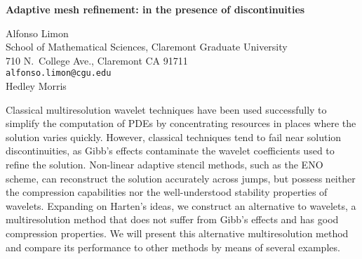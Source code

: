 \documentclass{report}
\begin{document}

\begin{center}
{\large
{\bf Adaptive mesh refinement: in the presence of discontinuities}}

	Alfonso Limon \\
	School of Mathematical Sciences, Claremont Graduate University \\
	710 N.~College Ave., Claremont CA 91711 \\
	{\tt alfonso.limon@cgu.edu} \\
	Hedley Morris
\end{center}
Classical multiresolution wavelet techniques have been used
successfully to simplify the computation of PDEs by
concentrating resources in places where the solution varies
quickly. However, classical techniques tend to fail near
solution discontinuities, as Gibb's effects contaminate the
wavelet coefficients used to refine the solution. Non-linear
adaptive stencil methods, such as the ENO scheme, can
reconstruct the solution accurately across jumps, but
possess neither the compression capabilities nor the
well-understood stability properties of wavelets. Expanding
on Harten's ideas, we construct an alternative to wavelets,
a multiresolution method that does not suffer from Gibb's
effects and has good compression properties. We will present
this alternative multiresolution method and compare its
performance to other methods by means of several examples.


\end{document}
